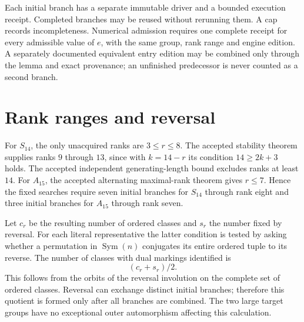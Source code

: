 \documentclass[11pt,a4paper]{article}
\newcommand{\Sym}{\operatorname{Sym}}
\begin{document}
Each initial branch has a separate immutable driver and a bounded
execution receipt. Completed branches may be reused without rerunning
them. A cap records incompleteness. Numerical admission requires one
complete receipt for every admissible value of $e$, with the same group,
rank range and engine edition. A separately documented equivalent entry
edition may be combined only through the lemma and exact provenance;
an unfinished predecessor is never counted as a second branch.

\section{Rank ranges and reversal}
For $S_{14}$, the only unacquired ranks are $3\leq r\leq8$.
The accepted stability theorem supplies ranks $9$ through $13$, since
with $k=14-r$ its condition $14\geq2k+3$ holds. The accepted independent
generating-length bound excludes ranks at least $14$.
For $A_{15}$, the accepted alternating maximal-rank theorem gives
$r\leq7$. Hence the fixed searches require seven initial branches for
$S_{14}$ through rank eight and three initial branches for $A_{15}$
through rank seven.

Let $c_r$ be the resulting number of ordered classes and $s_r$ the number
fixed by reversal. For each literal representative the latter condition
is tested by asking whether a permutation in $\Sym(n)$ conjugates its
entire ordered tuple to its reverse. The number of classes with dual
markings identified is
\[
                         (c_r+s_r)/2.
\]
This follows from the orbits of the reversal involution on the complete
set of ordered classes. Reversal can exchange distinct initial branches;
therefore this quotient is formed only after all branches are combined.
The two large target groups have no exceptional outer automorphism affecting
this calculation.
\end{document}
